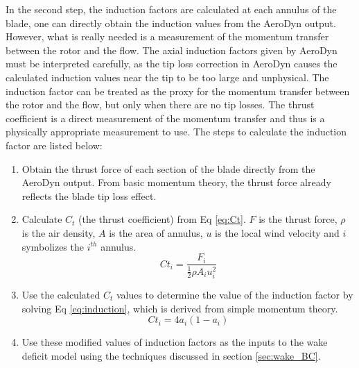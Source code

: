 \documentclass{umthesis}
\begin{document}
In the second step, the induction factors are calculated at each annulus of the blade, one can directly obtain the induction values from the AeroDyn output. However, what is really needed is a measurement of the momentum transfer between the rotor and the flow. The axial induction factors given by AeroDyn must be interpreted carefully, as the tip loss correction in AeroDyn causes the calculated induction values near the tip to be too large and unphysical. The induction factor can be treated as the proxy for the momentum transfer between the rotor and the flow, but only when there are no tip losses. The thrust coefficient is a direct measurement of the momentum transfer and thus is a physically appropriate measurement to use. The steps to calculate the induction factor are listed below:
\begin{enumerate}
  \item Obtain the thrust force of each section of the blade directly from the AeroDyn output. From basic momentum theory, the thrust force already reflects the blade tip loss effect.
  \item Calculate $C_t$ (the thrust coefficient) from Eq \ref{eq:Ct}. $F$ is the thrust force, $\rho$ is the air density, $A$ is the area of annulus, $u$ is the local wind velocity and $i$ symbolizes the $i^{th}$ annulus.
      \begin{equation}\label{eq:Ct}
      Ct_i=\frac{F_i}{\frac{1}{2}\rho A_i u_i^2}
      \end{equation}
  \item Use the calculated $C_t$ values to determine the value of the induction factor by solving Eq \ref{eq:induction}, which is derived from simple momentum theory.
      \begin{equation}\label{eq:induction}
      Ct_i=4a_i(1-a_i)
      \end{equation}
  \item Use these modified values of induction factors as the inputs to the wake deficit model using the techniques discussed in section \ref{sec:wake_BC}.
\end{enumerate}
\end{document}
